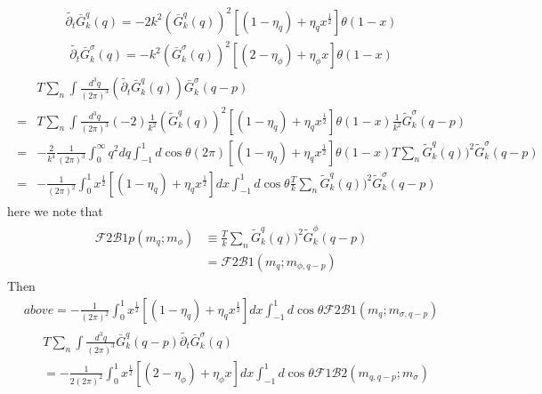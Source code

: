 \documentclass[12pt]{article}
\begin{document}
\begin{eqnarray}
\tilde{\partial_t}  \bar G^q_k (q) = -2k^2 (\bar G^q_k(q))^2 [(1-\eta_q)+\eta_q x^{\frac{1}{2}}]\theta(1-x)
\end{eqnarray}
\begin{eqnarray}
\tilde{\partial_t}  \bar G^{\sigma}_k (q) = -k^2 (\bar G^{\sigma}_k(q))^2 [(2-\eta_\phi)+\eta_\phi x]\theta(1-x)
\end{eqnarray}
\begin{eqnarray}
\begin{split}
&T \sum_n\int \frac{d^3q}{(2 \pi)^3}(\tilde{\partial_t}  \bar G^q_k (q)) \bar G^{\sigma}_k(q-p)\\
=&T \sum_n \int \frac{d^3q}{(2 \pi)^3} (-2)\frac{1}{k^2} (\tilde G^q_k(q))^2 [(1-\eta_q)+\eta_q x^{\frac{1}{2}}]\theta(1-x)\frac{1}{k^2} \tilde G^{\sigma}_k(q-p) \\
=& -\frac{2}{k^4} \frac{1}{(2\pi)^3}\int_0^{\infty} q^2 dq \int_{-1}^{1} d \cos \theta  (2\pi)[(1-\eta_q)+\eta_q x^{\frac{1}{2}}]\theta(1-x) T \sum_n \tilde G^q_k(q))^2 \tilde G^{\sigma}_k(q-p) \\
=&-\frac{1}{(2 \pi)^2} \int_{0}^{1}  x^{\frac{1}{2}}[(1-\eta_q)+\eta_q x^{\frac{1}{2}}] dx \int_{-1}^{1} d \cos \theta \frac{T}{k} \sum_n \tilde G^q_k(q))^2 \tilde G^{\sigma}_k(q-p) 
\end{split}
\end{eqnarray}
here we note that
\begin{eqnarray}
\begin{split}
\mathcal{F}2\mathcal{B}1p(m_q;m_{\phi})&\equiv \frac{T}{k} \sum_n \tilde G^q_k(q))^2 \tilde G^{\phi}_k(q-p) \\
&=\mathcal{F}2\mathcal{B}1(m_q;m_{\phi,q-p})
\end{split}
\end{eqnarray}
Then
\begin{eqnarray}
above=-\frac{1}{(2 \pi)^2} \int_{0}^{1}  x^{\frac{1}{2}}[(1-\eta_q)+\eta_q x^{\frac{1}{2}}] dx \int_{-1}^{1} d \cos \theta \mathcal{F}2\mathcal{B}1(m_q;m_{\sigma,q-p})
\end{eqnarray}
\begin{eqnarray}
\begin{split}
&T \sum_n\int \frac{d^3q}{(2 \pi)^3}\bar G^q_k (q-p)\tilde{\partial_t}  \bar G^{\sigma}_k(q)\\
&=-\frac{1}{2(2 \pi)^2}\int_0^1 x^{\frac{1}{2}}[(2-\eta_\phi)+\eta_\phi x] dx\int_{-1}^{1} d\cos \theta \mathcal{F}1\mathcal{B}2(m_{q,q-p};m_{\sigma})
\end{split}
\end{eqnarray}
\end{document}
